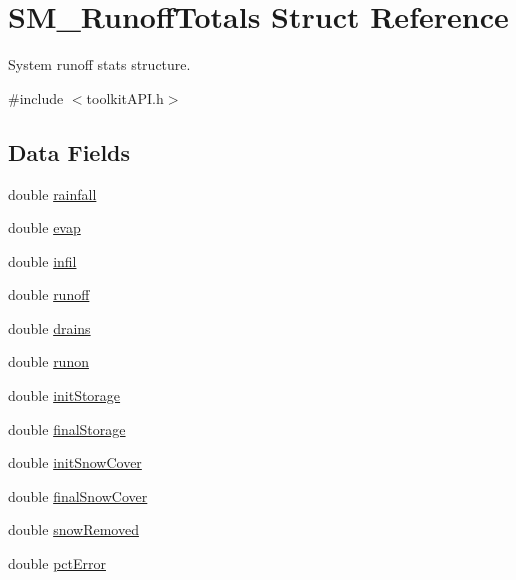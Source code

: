 \hypertarget{struct_s_m___runoff_totals}{}\section{S\+M\+\_\+\+Runoff\+Totals Struct Reference}
\label{struct_s_m___runoff_totals}


System runoff stats structure.  




{\ttfamily \#include $<$toolkit\+A\+P\+I.\+h$>$}

\subsection*{Data Fields}
\begin{DoxyCompactItemize}
\item 
double \hyperlink{struct_s_m___runoff_totals_a9e7224629321a940c1f8f9a64e73a588}{rainfall}
\item 
double \hyperlink{struct_s_m___runoff_totals_aac3c1df7592191453d2ff02e5ff1b7e6}{evap}
\item 
double \hyperlink{struct_s_m___runoff_totals_a6cd5b8d39e713bd1618a254d53def9b2}{infil}
\item 
double \hyperlink{struct_s_m___runoff_totals_a4dcd362194c38698fe8f5b2659ba2dc6}{runoff}
\item 
double \hyperlink{struct_s_m___runoff_totals_aee262996ca8263b6f94774a0c337ddb4}{drains}
\item 
double \hyperlink{struct_s_m___runoff_totals_ac05f157303936535978c7e69f6dfb16f}{runon}
\item 
double \hyperlink{struct_s_m___runoff_totals_add0f27c9cc788302f259ee9a4c9b2f48}{init\+Storage}
\item 
double \hyperlink{struct_s_m___runoff_totals_ae2e8a073faa2b013982ffc0fedf9e376}{final\+Storage}
\item 
double \hyperlink{struct_s_m___runoff_totals_ae3c3a619de037ede60b6ad04b80ae3dc}{init\+Snow\+Cover}
\item 
double \hyperlink{struct_s_m___runoff_totals_a50e84cf1314dcc39864c68c3ad316055}{final\+Snow\+Cover}
\item 
double \hyperlink{struct_s_m___runoff_totals_ad3b23dfe7238169f9f3a0530fba2ba39}{snow\+Removed}
\item 
double \hyperlink{struct_s_m___runoff_totals_a061bfec118db4216f0062258ce029ec2}{pct\+Error}
\end{DoxyCompactItemize}


